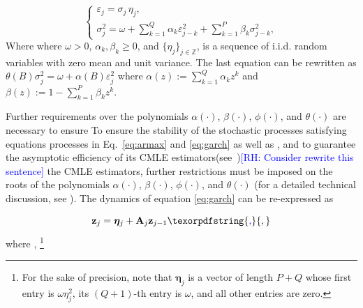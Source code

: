 \documentclass[10pt,a4paper,oneside]{article}
\newcommand{\Z}{\mathbb{Z}}
\newcommand{\rh}[1]{\textcolor{blue}{\textsf{[RH: #1]}}}
\providecommand{\DIFaddtex}[1]{{\protect\color{blue} \sf #1}} %
\providecommand{\DIFdeltex}[1]{{\protect\color{red} \scriptsize #1}} %
\providecommand{\DIFaddbegin}{} %
\providecommand{\DIFaddend}{} %
\providecommand{\DIFdelbegin}{} %
\providecommand{\DIFdelend}{} %
\providecommand{\DIFadd}[1]{\texorpdfstring{\DIFaddtex{#1}}{#1}} %
\providecommand{\DIFdel}[1]{\texorpdfstring{\DIFdeltex{#1}}{}} %
\newcommand{\DIFscaledelfig}{0.5}
\newlength{\DIFdelgraphicswidth} %
\newlength{\DIFdelgraphicsheight} %
\newcommand{\DIFaddincludegraphics}[2][]{{\color{blue}\fbox{\DIFOincludegraphics[#1]{#2}}}} %
\newcommand{\DIFdelincludegraphics}[2][]{%
\sbox{\DIFdelgraphicsbox}{\DIFOincludegraphics[#1]{#2}}%
\settoboxwidth{\DIFdelgraphicswidth}{\DIFdelgraphicsbox} %
\settoboxtotalheight{\DIFdelgraphicsheight}{\DIFdelgraphicsbox} %
\scalebox{\DIFscaledelfig}{%
\parbox[b]{\DIFdelgraphicswidth}{\usebox{\DIFdelgraphicsbox}\\[-\baselineskip] \rule{\DIFdelgraphicswidth}{0em}}\llap{\resizebox{\DIFdelgraphicswidth}{\DIFdelgraphicsheight}{%
\setlength{\unitlength}{\DIFdelgraphicswidth}%
\begin{picture}(1,1)%
\thicklines\linethickness{2pt} %
{\color[rgb]{1,0,0}\put(0,0){\framebox(1,1){}}}%
{\color[rgb]{1,0,0}\put(0,0){\line( 1,1){1}}}%
{\color[rgb]{1,0,0}\put(0,1){\line(1,-1){1}}}%
\end{picture}%
}\hspace*{3pt}}} %
} %
\DeclareRobustCommand{\DIFaddbegin}{\DIFOaddbegin \let\includegraphics\DIFaddincludegraphics} %
\DeclareRobustCommand{\DIFaddend}{\DIFOaddend \let\includegraphics\DIFOincludegraphics} %
\DeclareRobustCommand{\DIFdelbegin}{\DIFOdelbegin \let\includegraphics\DIFdelincludegraphics} %
\DeclareRobustCommand{\DIFdelend}{\DIFOaddend \let\includegraphics\DIFOincludegraphics} %
\begin{document}
\begin{equation}
    \DIFdelbegin %
\DIFdelend \DIFaddbegin \begin{cases}
        \varepsilon_j = \sigma_j \,\eta_j, \\[6pt]
        \sigma_j^2 = \omega + \sum^{Q}_{k = 1} \alpha_k \varepsilon^2_{j - k} + \sum^P_{k = 1} \beta_k \sigma_{j - k}^2,
    \end{cases}\DIFaddend 
    \label{eq:garch}
\end{equation}
\DIFdelbegin \DIFdel{Where }\DIFdelend \DIFaddbegin \DIFadd{where }\DIFaddend $\omega > 0$, $\alpha_k, \beta_k \geq 0$, and $\{ \eta_j\}_{j \in \Z}$, is a sequence of i.i.d. random variables with zero mean and unit variance. The last equation can be rewritten as $\theta(B) \sigma^2_j = \omega + \alpha(B) \varepsilon^2_j$ where $\alpha(z) := \sum^Q_{k = 1} \alpha_k z^k$ and $\beta(z) := 1 - \sum^P_{k = 1} \beta_k z^k$.

\DIFdelbegin \DIFdel{Further requirements over the polynomials $\alpha(\cdot)$, $\beta(\cdot)$, $\phi(\cdot)$, and $\theta(\cdot)$ are necessary to ensure }\DIFdelend \DIFaddbegin \DIFadd{To ensure the }\DIFaddend stability of the \DIFdelbegin \DIFdel{stochastic processes satisfying equations}\DIFdelend \DIFaddbegin \DIFadd{processes in Eq.}\DIFaddend ~\eqref{eq:armax} and \eqref{eq:garch}\DIFdelbegin \DIFdel{as well as }\DIFdelend \DIFaddbegin \DIFadd{, and to guarantee }\DIFaddend the asymptotic efficiency of \DIFdelbegin \DIFdel{its CMLE estimators(see~\cite{mejia2025asymptotic})\rh{Consider rewrite this sentence}}\DIFdelend \DIFaddbegin \DIFadd{the CMLE estimators, further restrictions must be imposed on the roots of the polynomials $\alpha(\cdot)$, $\beta(\cdot)$, $\phi(\cdot)$, and $\theta(\cdot)$ (for a detailed technical discussion, see \cite{mejia2025asymptotic})}\DIFaddend . The dynamics of equation \eqref{eq:garch} can be re-expressed as

\begin{equation}
    \mathbf{z}_j = \boldsymbol{\eta}_j + \mathbf{A}_j \mathbf{z}_{j - 1}\DIFaddbegin \DIFadd{,
    }\DIFaddend \label{eq:markov_rep_garch}
\end{equation}
where\DIFdelbegin \DIFdel{,
}\DIFdelend \DIFaddbegin \footnote{\DIFadd{For the sake of precision, note that $\boldsymbol{\eta}_j$ is a vector of length $P+Q$ whose first entry is $\omega \eta_j^2$, its $(Q+1)$-th entry is $\omega$, and all other entries are zero.}}
\DIFaddend 
\end{document}
